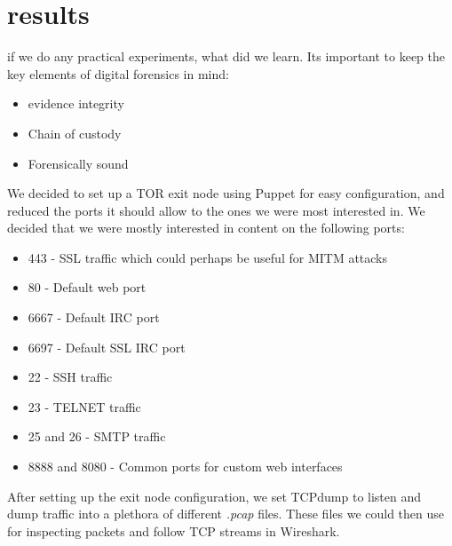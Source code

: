 \section{results}
if we do any practical experiments, what did we learn.
Its important to keep the key elements of digital forensics in mind:
\begin{itemize}
\item evidence integrity
\item Chain of custody
\item Forensically sound
\end{itemize}
We decided to set up a TOR exit node using Puppet for easy configuration, and reduced the ports it should allow to the ones we were most interested in. We decided that we were mostly interested in content on the following ports:\\

\begin{itemize}
	\item 443 - SSL traffic which could perhaps be useful for MITM attacks
	\item 80 - Default web port
	\item 6667 - Default IRC port
	\item 6697 - Default SSL IRC port
	\item 22 - SSH traffic
	\item 23 - TELNET traffic
	\item 25 and 26 - SMTP traffic
	\item 8888 and 8080 - Common ports for custom web interfaces
\end{itemize}

After setting up the exit node configuration, we set TCPdump to listen and dump traffic into a plethora of different \textit{.pcap} files. These files we could then use for inspecting packets and follow TCP streams in Wireshark.\\

